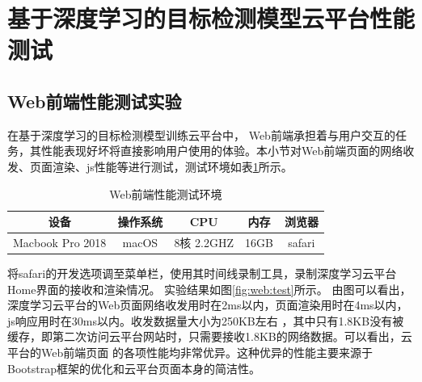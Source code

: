 \section{基于深度学习的目标检测模型云平台性能测试}
 
\subsection{Web前端性能测试实验}  
 
在基于深度学习的目标检测模型训练云平台中，
Web前端承担着与用户交互的任务，其性能表现好坏将直接影响用户使用的体验。本小节对Web前端页面的网络收发、页面渲染、js性能等进行测试，测试环境如表\ref{table:Web:env}所示。

{
    \begin{table}[htb]   
        \caption{Web前端性能测试环境}
        \label{table:Web:env}
        \centering
        \begin{tabular}[t]{ccccc}
            \hline
            设备 & 操作系统 & CPU & 内存 & 浏览器\\
            \hline
            Macbook Pro 2018 & macOS & 8核 2.2GHZ & 16GB & safari \\
            \hline
        \end{tabular}
    \end{table}
}

将safari的开发选项调至菜单栏，使用其时间线录制工具，录制深度学习云平台Home界面的接收和渲染情况。
实验结果如图\ref{fig:web:test}所示。
由图可以看出，深度学习云平台的Web页面网络收发用时在2ms以内，页面渲染用时在4ms以内，js响应用时在30ms以内。收发数据量大小为250KB左右
，其中只有1.8KB没有被缓存，即第二次访问云平台网站时，只需要接收1.8KB的网络数据。可以看出，云平台的Web前端页面
的各项性能均非常优异。这种优异的性能主要来源于Bootstrap框架的优化和云平台页面本身的简洁性。

